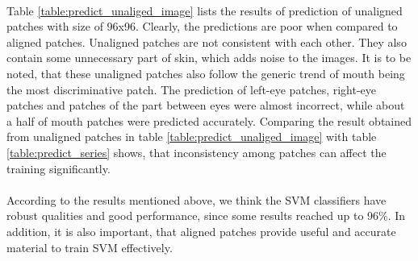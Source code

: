\\
Table \ref{table:predict_unaliged_image} lists the results of prediction of unaligned patches with size of 96x96. Clearly, the predictions are poor when compared to aligned patches. Unaligned patches are not consistent with each other. They also contain some unnecessary part of skin, which adds noise to the images. It is to be noted, that these unaligned patches also follow the generic trend of mouth being the most discriminative patch. The prediction of left-eye patches, right-eye patches and patches of the part between eyes were almost incorrect, while about a half of mouth patches were predicted accurately. Comparing the result obtained from unaligned patches in table \ref{table:predict_unaliged_image} with table \ref{table:predict_series} shows, that inconsistency among patches can affect the training significantly.
\\
\\
According to the results mentioned above, we think the SVM classifiers have robust qualities and good performance, since some results reached up to 96\%. In addition, it is also important, that aligned patches provide useful and accurate material to train SVM effectively.
